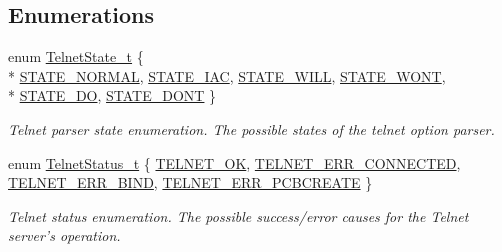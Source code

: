 \subsection*{Enumerations}
\begin{DoxyCompactItemize}
\item 
enum \hyperlink{group__telnet__server_ga6a34decdb77d8c9df8ead5420ea8d326}{Telnet\-State\-\_\-t} \{ \\*
\hyperlink{group__telnet__server_gga6a34decdb77d8c9df8ead5420ea8d326ae583c55c9f9a3aa9888e4ed771d6a9b6}{S\-T\-A\-T\-E\-\_\-\-N\-O\-R\-M\-A\-L}, 
\hyperlink{group__telnet__server_gga6a34decdb77d8c9df8ead5420ea8d326ac445fb392e1398d85894ed95c217535d}{S\-T\-A\-T\-E\-\_\-\-I\-A\-C}, 
\hyperlink{group__telnet__server_gga6a34decdb77d8c9df8ead5420ea8d326aab00693e6446eb0b2dd86441e16fa7bd}{S\-T\-A\-T\-E\-\_\-\-W\-I\-L\-L}, 
\hyperlink{group__telnet__server_gga6a34decdb77d8c9df8ead5420ea8d326a1c98dcef9f1808d490980c9660d07356}{S\-T\-A\-T\-E\-\_\-\-W\-O\-N\-T}, 
\\*
\hyperlink{group__telnet__server_gga6a34decdb77d8c9df8ead5420ea8d326a690d160db6429d82862282d94e3b4c4f}{S\-T\-A\-T\-E\-\_\-\-D\-O}, 
\hyperlink{group__telnet__server_gga6a34decdb77d8c9df8ead5420ea8d326a8efcfd07c99adc3da1f982af25bb6054}{S\-T\-A\-T\-E\-\_\-\-D\-O\-N\-T}
 \}
\begin{DoxyCompactList}\small\item\em Telnet parser state enumeration. The possible states of the telnet option parser. \end{DoxyCompactList}\item 
enum \hyperlink{group__telnet__server_gab6653d6c1bd1261ebfcb4d667f848716}{Telnet\-Status\-\_\-t} \{ \hyperlink{group__telnet__server_ggab6653d6c1bd1261ebfcb4d667f848716a63347d81d258d4f3c53dca873fbe3b41}{T\-E\-L\-N\-E\-T\-\_\-\-O\-K}, 
\hyperlink{group__telnet__server_ggab6653d6c1bd1261ebfcb4d667f848716ade43926fa79e7274b5a207aa99dfbf80}{T\-E\-L\-N\-E\-T\-\_\-\-E\-R\-R\-\_\-\-C\-O\-N\-N\-E\-C\-T\-E\-D}, 
\hyperlink{group__telnet__server_ggab6653d6c1bd1261ebfcb4d667f848716a0ebd3cbc0fc21b74010e6faf772852e9}{T\-E\-L\-N\-E\-T\-\_\-\-E\-R\-R\-\_\-\-B\-I\-N\-D}, 
\hyperlink{group__telnet__server_ggab6653d6c1bd1261ebfcb4d667f848716a01d38959911101e3354606780cf67a6d}{T\-E\-L\-N\-E\-T\-\_\-\-E\-R\-R\-\_\-\-P\-C\-B\-C\-R\-E\-A\-T\-E}
 \}
\begin{DoxyCompactList}\small\item\em Telnet status enumeration. The possible success/error causes for the Telnet server's operation. \end{DoxyCompactList}\end{DoxyCompactItemize}
